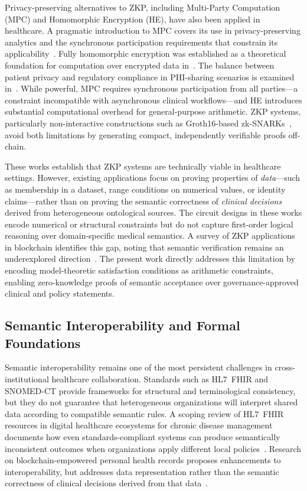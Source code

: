 \documentclass[journal]{IEEEtran}
\begin{document}
Privacy-preserving alternatives to ZKP, including Multi-Party
Computation (MPC) and Homomorphic Encryption (HE), have also been
applied in healthcare. A pragmatic introduction to MPC covers its
use in privacy-preserving analytics and the synchronous participation
requirements that constrain its applicability~\cite{Evans2018}. Fully
homomorphic encryption was established as a theoretical foundation for
computation over encrypted data in~\cite{Gentry2009}. The balance
between patient privacy and regulatory compliance in PHI-sharing
scenarios is examined in~\cite{Amin2024}. While powerful, MPC
requires synchronous participation from all parties---a constraint
incompatible with asynchronous clinical workflows---and HE introduces
substantial computational overhead for general-purpose arithmetic.
ZKP systems, particularly non-interactive constructions such as
Groth16-based zk-SNARKs~\cite{groth2016}, avoid both limitations by
generating compact, independently verifiable proofs off-chain.

These works establish that ZKP systems are technically viable in
healthcare settings. However, existing applications focus on proving
properties of \emph{data}---such as membership in a dataset, range
conditions on numerical values, or identity claims---rather than on
proving the semantic correctness of \emph{clinical decisions} derived
from heterogeneous ontological sources. The circuit designs in these
works encode numerical or structural constraints but do not capture
first-order logical reasoning over domain-specific medical semantics.
A survey of ZKP applications in blockchain identifies this gap,
noting that semantic verification remains an underexplored
direction~\cite{peng2024zkpblockchain}. The present work directly
addresses this limitation by encoding model-theoretic satisfaction
conditions as arithmetic constraints, enabling zero-knowledge proofs
of semantic acceptance over governance-approved clinical and policy
statements.

\subsection{Semantic Interoperability and Formal Foundations}
\label{ss:semantic}

Semantic interoperability remains one of the most persistent
challenges in cross-institutional healthcare collaboration. Standards
such as HL7~FHIR and SNOMED-CT provide frameworks for structural and
terminological consistency, but they do not guarantee that
heterogeneous organizations will interpret shared data according to
compatible semantic rules. A scoping review of HL7~FHIR resources in
digital healthcare ecosystems for chronic disease management documents
how even standards-compliant systems can produce semantically
inconsistent outcomes when organizations apply different local
policies~\cite{gazzarata2024hl7}. Research on blockchain-empowered
personal health records proposes enhancements to interoperability,
but addresses data representation rather than the semantic correctness
of clinical decisions derived from that data~\cite{jha2025blockchain}.
\end{document}
